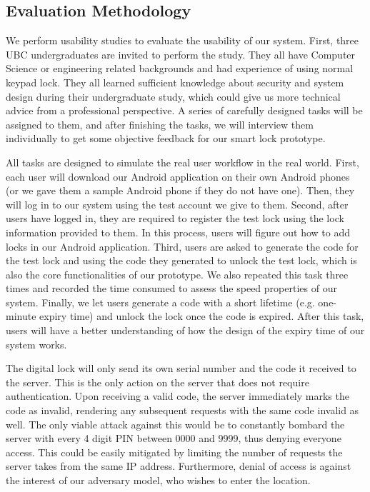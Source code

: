 \documentclass[conference]{IEEEtran}
\begin{document}
\subsection{Evaluation Methodology}
We perform usability studies to evaluate the usability of our system. First, three UBC undergraduates are invited to perform the study. They all have Computer Science or engineering related backgrounds and had experience of using normal keypad lock. They all learned sufficient knowledge about security and system design during their undergraduate study, which could give us more technical advice from a professional perspective.  A series of carefully designed tasks will be assigned to them, and after finishing the tasks, we will interview them individually to get some objective feedback for our smart lock prototype.

All tasks are designed to simulate the real user workflow in the real world. First, each user will download our Android application on their own Android phones (or we gave them a sample Android phone if they do not have one). Then, they will log in to our system using the test account we give to them. Second, after users have logged in, they are required to register the test lock using the lock information provided to them. In this process, users will figure out how to add locks in our Android application. Third, users are asked to generate the code for the test lock and using the code they generated to unlock the test lock, which is also the core functionalities of our prototype. We also repeated this task three times and recorded the time consumed to assess the speed properties of our system.  Finally, we let users generate a code with a short lifetime (e.g. one-minute expiry time) and unlock the lock once the code is expired. After this task, users will have a better understanding of how the design of the expiry time of our system works.

The digital lock will only send its own serial number and the code it received to the server. This is the only action on the server that does not require authentication. Upon receiving a valid code, the server immediately marks the code as invalid, rendering any subsequent requests with the same code invalid as well. The only viable attack against this would be to constantly bombard the server with every 4 digit PIN between 0000 and 9999, thus denying everyone access. This could be easily mitigated by limiting the number of requests the server takes from the same IP address. Furthermore, denial of access is against the interest of our adversary model, who wishes to enter the location.
\end{document}
